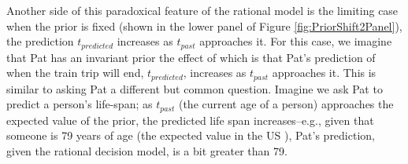 Another side of this paradoxical feature of the rational model is the limiting case when the prior is fixed (shown in the lower panel of Figure \ref{fig:PriorShift2Panel}), the prediction $t_{predicted}$ increases as $t_{past}$ approaches it.  For this case, we imagine that Pat has an invariant prior the effect of which is that Pat's prediction of when the train trip will end, $t_{predicted}$, increases as $t_{past}$ approaches it.  This is similar to asking Pat a different but common question. Imagine we ask Pat to predict a person's life-span; as $t_{past}$ (the current age of a person) approaches the expected value of the prior, the predicted life span increases--e.g., given that someone is 79 years of age (the expected value in the US \cite{Arias2019}), Pat's prediction, given the rational decision model, is a bit greater than 79.

